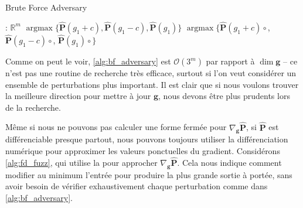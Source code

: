 \begin{algorithm}[H]
\caption{Brute Force Adversary}
\label{alg:bf_adversary}
\begin{algorithmic}[1]
: $\mathbb{R}^m$
 
\State \Return $\operatorname{argmax}\{\mathbf{\hat P}(g_1 + c), \mathbf{\hat P}(g_1 - c), \mathbf{\hat P}(g_1)\}$
\Else {}
\State \Return $\operatorname{argmax}\{\mathbf{\hat P}(g_1 + c) \circ$,\newline
\hspace*{10em} $\mathbf{\hat P}(g_1 - c)\circ$,\newline
\hspace*{10em} $\mathbf{\hat P}(g_1)\circ$$\}$
\EndIf
\EndProcedure
\end{algorithmic}
\end{algorithm}

Comme on peut le voir, \autoref{alg:bf_adversary} est $\mathcal{O}(3^m)$ par rapport à $\dim \mathbf g$ -- ce n'est pas une routine de recherche très efficace, surtout si l'on veut considérer un ensemble de perturbations plus important. Il est clair que si nous voulons trouver la meilleure direction pour mettre à jour $\mathbf g$, nous devons être plus prudents lors de la recherche.

Même si nous ne pouvons pas calculer une forme fermée pour $\nabla_{\mathbf g}\mathbf{\hat P}$, si $\mathbf{\hat P}$ est différenciable presque partout, nous pouvons toujours utiliser la différenciation numérique pour approximer les valeurs ponctuelles du gradient. Considérons \autoref{alg:fd_fuzz}, qui utilise la  pour approcher $\nabla_{\mathbf g}\mathbf{\hat P}$. Cela nous indique comment modifier au minimum l'entrée pour produire la plus grande sortie à portée, sans avoir besoin de vérifier exhaustivement chaque perturbation comme dans \autoref{alg:bf_adversary}.

